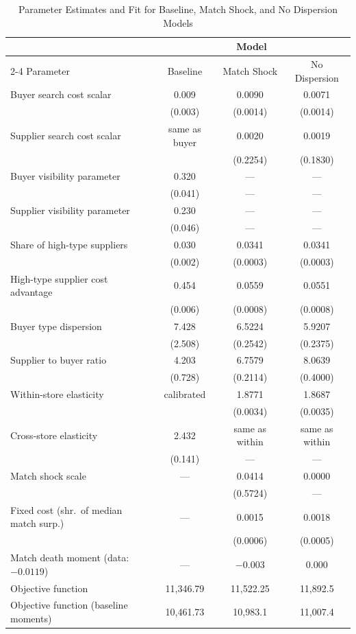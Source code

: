 \documentclass[12pt]{article} \usepackage{amsmath,amssymb,amsthm,geometry,graphicx,setspace,algorithm,algpseudocode,float}
\begin{document}
\begin{table}[htpb]
\centering
\caption{Parameter Estimates and Fit for Baseline, Match Shock, and No Dispersion Models}
\label{tab:MP_parameter_estimates}
\begin{tabular}{lccc}
\toprule
 & \multicolumn{3}{c}{Model} \\
\cmidrule(lr){2-4}
Parameter & Baseline & Match Shock & No Dispersion \\
\midrule
Buyer search cost scalar & 0.009 & 0.0090 & 0.0071 \\
& (0.003) & (0.0014) & (0.0014) \\
Supplier search cost scalar & same as buyer & 0.0020 & 0.0019 \\
&  & (0.2254) & (0.1830) \\
Buyer visibility parameter & 0.320 & --- & --- \\
& (0.041) & --- & --- \\
Supplier visibility parameter & 0.230 & --- & --- \\
& (0.046) & --- & --- \\
Share of high-type suppliers & 0.030 & 0.0341 & 0.0341 \\
& (0.002) & (0.0003) & (0.0003) \\
High-type supplier cost advantage & 0.454 & 0.0559 & 0.0551 \\
& (0.006) & (0.0008) & (0.0008) \\
Buyer type dispersion & 7.428 & 6.5224 & 5.9207 \\
& (2.508) & (0.2542) & (0.2375) \\
Supplier to buyer ratio & 4.203 & 6.7579 & 8.0639 \\
& (0.728) & (0.2114) & (0.4000) \\
Within-store elasticity & calibrated & 1.8771 & 1.8687 \\
&  & (0.0034) & (0.0035) \\
Cross-store elasticity & 2.432 & same as within & same as within \\
& (0.141) & --- & --- \\
Match shock scale & --- & 0.0414 & 0.0000 \\
&  & (0.5724) & --- \\
Fixed cost (shr.\ of median match surp.) & --- & 0.0015 & 0.0018 \\
&  & (0.0006) & (0.0005) \\
\midrule
Match death moment (data: $-0.0119$) & --- & $-0.003$ & 0.000 \\
Objective function & 11,346.79 & 11,522.25 & 11,892.5 \\
Objective function (baseline moments) & 10,461.73 & 10,983.1 & 11,007.4 \\
\bottomrule
\end{tabular}
\end{table}
\end{document}

